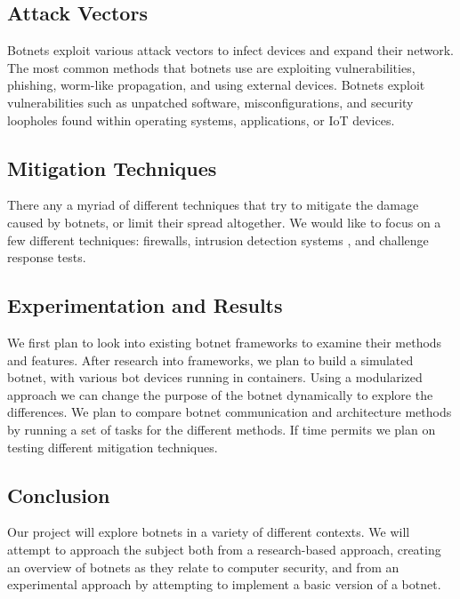 \documentclass[english,12pt]{article}
\begin{document}
\subsection*{Attack Vectors}
Botnets exploit various attack vectors to infect devices 
and expand their network. The most common methods that botnets 
use are exploiting vulnerabilities, phishing, worm-like propagation, 
and using external devices. Botnets exploit vulnerabilities such as 
unpatched software, misconfigurations, and security loopholes 
found within operating systems, applications, or IoT devices. 
\subsection*{Mitigation Techniques}
There any a myriad of different techniques that try to mitigate the damage
caused by botnets, or limit their spread altogether. We would like to focus
on a few different techniques: firewalls, intrusion detection systems \cite{Stefan:2000}, and
challenge response tests.
\subsection*{Experimentation and Results}
We first plan to look into existing 
botnet frameworks to examine their methods and features. 
After research into frameworks, we plan to build a simulated botnet, 
with various bot devices running in containers. 
Using a modularized approach we can change the purpose of the botnet 
dynamically to explore the differences. We plan to compare botnet 
communication and architecture methods by running a set of tasks 
for the different methods. If time permits we plan on testing different 
mitigation techniques.
\subsection*{Conclusion}
Our project will explore botnets in a variety of different contexts. 
We will attempt to approach the subject both from a research-based approach,
creating an overview of botnets as they relate to computer security,
and from an experimental approach by attempting to implement a basic version of
a botnet.
\printbibliography
\end{document}
